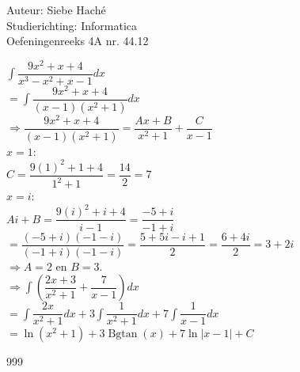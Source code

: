 \documentclass[a4paper]{article}
\newcommand{\Bgtan}{\operatorname{Bgtan}}
\begin{document}
\noindent \large Auteur: Siebe Haché \\
\noindent \large Studierichting: Informatica\\
\noindent \large Oefeningenreeks 4A nr. 44.12\\

\medskip

\normalsize

$ \displaystyle\int\dfrac{9x^2 +x +4}{x^3-x^2+x-1}dx$\\

$= \displaystyle\int\dfrac{9x^2 +x +4}{(x-1)(x^2+1)}dx$\\

$\Rightarrow \dfrac{9x^2 +x +4}{(x-1)(x^2+1)} = \dfrac{Ax+B}{x^2+1}+ \dfrac{C}{x-1}$\\

$x = 1$:\\

$C = \dfrac{9(1)^2+1+4}{1^2+1} = \dfrac{14}{2} = 7$\\

$x = i$:\\

$Ai + B = \dfrac{9(i)^2+i+4}{i-1} = \dfrac{-5+i}{-1+i}$\\

$= \dfrac{(-5+i)(-1-i)}{(-1+i)(-1-i)} = \dfrac{5+5i-i+1}{2} = \dfrac{6+4i}{2} = 3 + 2i$\\

$\Rightarrow A = 2$ en $B = 3$.\\

$\Rightarrow \displaystyle\int\left(\dfrac{2x + 3}{x^2 +1} + \dfrac{7}{x-1}\right)dx$\\

$= \displaystyle\int\dfrac{2x}{x^2 +1} dx+ 3\displaystyle\int\dfrac{1}{x^2+1} dx+ 7\displaystyle\int\dfrac{1}{x-1} dx$\\

$= \ln(x^2+1) + 3 \Bgtan(x) + 7\ln\left|x-1\right|+ C$



\begin{thebibliography}{999}
\end{thebibliography}
\end{document}
